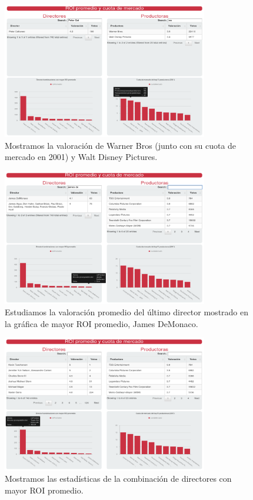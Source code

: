 \documentclass[11pt]{opticajnl}
\begin{document}
\begin{figure}[H]
\centering
\includegraphics[width=0.8\textwidth]{fotos/2.png}
\caption{Mostramos la valoración de Warner Bros (junto con su cuota de mercado en 2001) y Walt Disney Pictures.}
\end{figure}

\begin{figure}[H]
\centering
\includegraphics[width=0.8\textwidth]{fotos/3.png}
\caption{Estudiamos la valoración promedio del último director mostrado en la gráfica de mayor ROI promedio, James DeMonaco.}
\end{figure}

\begin{figure}[H]
\centering
\includegraphics[width=0.8\textwidth]{fotos/5.png}
\caption{Mostramos las estadísticas de la combinación de directores con mayor ROI promedio.}
\end{figure}
\end{document}
